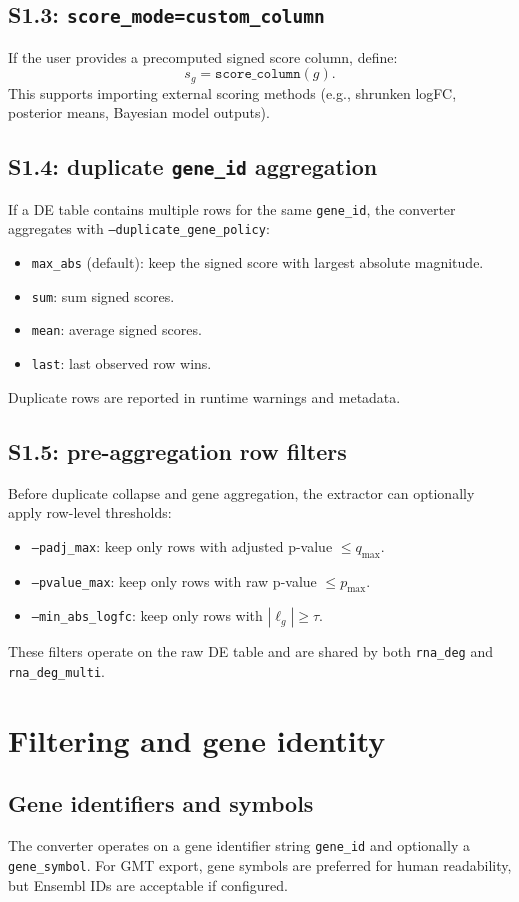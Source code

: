 \documentclass[11pt]{article}
\begin{document}
\subsection{S1.3: \texttt{score\_mode=custom\_column}}
If the user provides a precomputed signed score column, define:
\[
s_g = \texttt{score\_column}(g).
\]
This supports importing external scoring methods (e.g., shrunken logFC, posterior means, Bayesian model outputs).

\subsection{S1.4: duplicate \texttt{gene\_id} aggregation}
If a DE table contains multiple rows for the same \texttt{gene\_id}, the converter aggregates with
\texttt{--duplicate\_gene\_policy}:
\begin{itemize}[leftmargin=2em]
\item \texttt{max\_abs} (default): keep the signed score with largest absolute magnitude.
\item \texttt{sum}: sum signed scores.
\item \texttt{mean}: average signed scores.
\item \texttt{last}: last observed row wins.
\end{itemize}
Duplicate rows are reported in runtime warnings and metadata.

\subsection{S1.5: pre-aggregation row filters}
Before duplicate collapse and gene aggregation, the extractor can optionally apply row-level thresholds:
\begin{itemize}[leftmargin=2em]
\item \texttt{--padj\_max}: keep only rows with adjusted p-value $\leq q_{\max}$.
\item \texttt{--pvalue\_max}: keep only rows with raw p-value $\leq p_{\max}$.
\item \texttt{--min\_abs\_logfc}: keep only rows with $|\ell_g| \geq \tau$.
\end{itemize}
These filters operate on the raw DE table and are shared by both \texttt{rna\_deg} and \texttt{rna\_deg\_multi}.

\section{Filtering and gene identity}
\subsection{Gene identifiers and symbols}
The converter operates on a gene identifier string \texttt{gene\_id} and optionally a \texttt{gene\_symbol}.
For GMT export, gene symbols are preferred for human readability, but Ensembl IDs are acceptable if configured.
\end{document}
